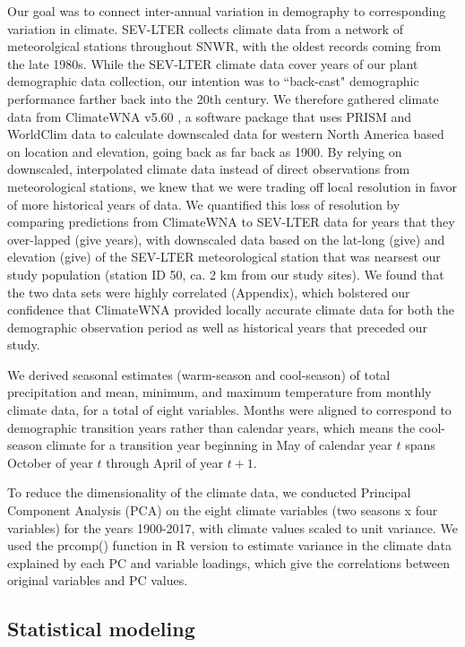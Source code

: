 \documentclass[12pt]{article}\usepackage[]{graphicx}\usepackage[]{color}
\begin{document}
Our goal was to connect inter-annual variation in demography to corresponding variation in climate.
SEV-LTER collects climate data from a network of meteorolgical stations throughout SNWR, with the oldest records coming from the late 1980s.
While the SEV-LTER climate data cover years of our plant demographic data collection, our intention was to ``back-cast" demographic performance farther back into the 20th century. 
We therefore gathered climate data from ClimateWNA v5.60 \citep{wang2016locally}, a software package that uses PRISM \cite{daly_physiographically_2008} and WorldClim \cite{hijmans_very_2005} data to calculate downscaled data for western North America based on location and elevation, going back as far back as 1900.
By relying on downscaled, interpolated climate data instead of direct observations from meteorological stations, we knew that we were trading off local resolution in favor of more historical years of data.
We quantified this loss of resolution by comparing predictions from ClimateWNA to SEV-LTER data for years that they over-lapped (give years), with downscaled data based on the lat-long (give) and elevation (give) of the SEV-LTER meteorological station that was nearsest our study population (station ID 50, ca. 2 km from our study sites).
We found that the two data sets were highly correlated (Appendix), which bolstered our confidence that ClimateWNA provided locally accurate climate data for both the demographic observation period as well as historical years that preceded our study.

We derived seasonal estimates (warm-season and cool-season) of total precipitation and mean, minimum, and maximum temperature from monthly climate data, for a total of eight variables. Months were aligned to correspond to demographic transition years rather than calendar years, which means the cool-season climate for a transition year beginning in May of calendar year $t$ spans October of year $t$ through April of year $t+1$. 

To reduce the dimensionality of the climate data, we conducted Principal Component Analysis (PCA) on the eight climate variables (two seasons x four variables) for the years 1900-2017, with climate values scaled to unit variance. We used the prcomp() function in R version to estimate variance in the climate data explained by each PC and variable loadings, which give the correlations between original variables and PC values.

\subsection*{Statistical modeling}
\end{document}
